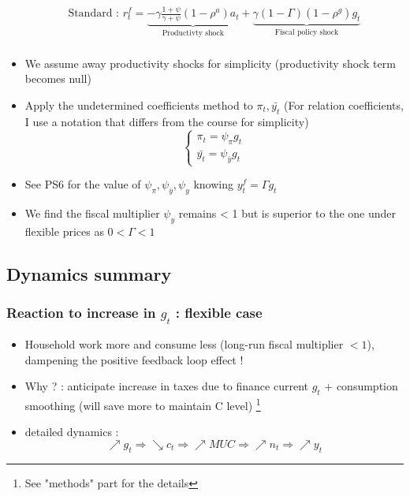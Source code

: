 \documentclass{article}
\begin{document}
\begin{itemize}
\begin{equation}
    \begin{aligned}
        \text{Standard : }r_t^f = \underbrace{-\gamma\frac{1+\psi}{\gamma+\psi}(1-\rho^a)a_t}_{\text{Productivty shock} }+\underbrace{\gamma(1-\Gamma)(1-\rho^g)g_t}_{\text{Fiscal policy shock}}\\
    \end{aligned}
    \end{equation}
    \item We assume away productivity shocks for simplicity (productivity shock term becomes null)
    \item Apply the undetermined coefficients method to $\pi_t, \bar{y_t}$ (For relation coefficients, I use a notation that differs from the course for simplicity)
    \begin{equation}
    \left\{
    \begin{aligned}
        \pi_t = \psi_\pi g_t\\
        \bar{y_t} = \psi_{\bar{y}}g_t
    \end{aligned}
    \right.
    \end{equation}
    \item See PS6 for the value of $\psi_\pi, \psi_{\bar{y}},\psi_y$ knowing $y_t^f =\Gamma g_t$
    \item We find the fiscal multiplier $\psi_y$ remains < 1 but is superior to the one under flexible prices as $0<\Gamma<1 $


\end{itemize}

\subsection{Dynamics summary}

\subsubsection{Reaction to increase in $g_t$ : flexible case}
\begin{itemize}
        \item Household work more and consume less (long-run fiscal multiplier $<1$), dampening the positive feedback loop effect ! 
        \item Why ? : anticipate increase in taxes due to finance current $g_t$ + consumption smoothing (will save more to maintain C level) \footnote{See "methods" part for the details}
        \item detailed dynamics : 
        \begin{equation}
            \nearrow g_t \Longrightarrow \searrow c_t \Longrightarrow \nearrow MUC \Longrightarrow \nearrow n_t \Longrightarrow \nearrow y_t 
        \end{equation}
 \end{itemize}
\end{document}
